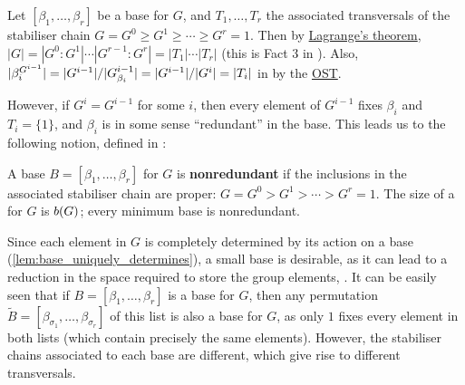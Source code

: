 \begin{proposition}\label{prop:stabiliser_chain_indexes}
    Let $[\beta_1,\dotsc,\beta_r]$ be a base for $G$, and $T_1,\dotsc,T_r$ the associated transversals of the stabiliser chain $G = G^0 \geq G^1 \geq \dotsb \geq G^r = 1$. Then by \hyperref[thm:lagrange]{Lagrange's theorem}, $|G| = |G^0 : G^1| \dotsb |G^{r-1} : G^r| = |T_1| \dotsb |T_r|$ (this is Fact 3 in \cite{blaha1992}). Also, $|\beta_i^{G^{i-1}}| = |G^{i-1}|/|\added{2}{G^{i-1}_{\beta_i}}| = |G^{i-1}|/|G^i| = |T_i|$ in  by the \hyperref[thm:orbit_stabiliser]{OST}. \qedhere
\end{proposition}

However, if $G^i = G^{i-1}$ for some $i$, then every element of $G^{i-1}$ fixes $\beta_i$ and $T_i = \{1\}$, and $\beta_i$ is in some sense ``redundant'' in the base.  This leads us to the following notion, defined in \cite{blaha1992}:

\begin{definition}\label{def:nonredundant_base}
    A base $B = [\beta_1,\dotsc,\beta_r]$ for $G$ is \textbf{nonredundant} if the inclusions in the associated stabiliser chain are proper: $G = G^0 > G^1 > \dotsb > G^r = 1$. The size of a  for $G$ is  $\added{2}{b(G)}$; every minimum base is nonredundant.
\end{definition}

Since each element in $G$ is completely determined by its action on a base (\autoref{lem:base_uniquely_determines}), a small base is desirable, as it can lead to a reduction in the space required to store the group elements,  \cite{blaha1992}. It can be easily seen that if $B = [\beta_1,\dotsc,\beta_r]$ is a base for $G$, then any permutation $\tilde B = [\beta_{\sigma_1},\dotsc,\beta_{\sigma_r}]$ of this list is also a base for $G$, as only $1$ fixes every element in both lists (which contain precisely the same elements). However, the stabiliser chains associated to each base are different, which give rise to different transversals.

